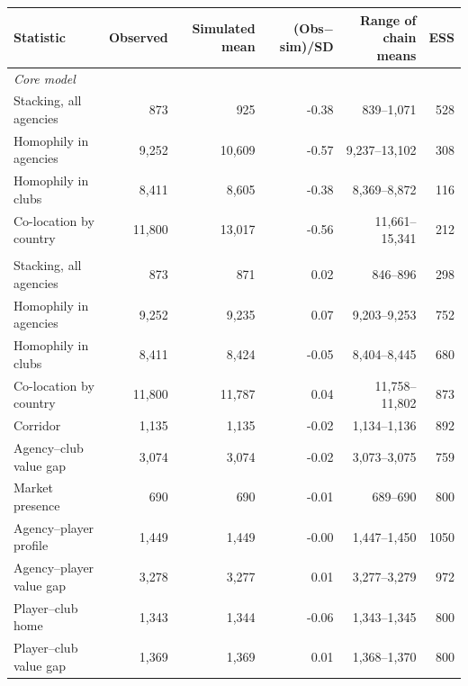 \begin{tabular}{l rrrr r}\toprule
Statistic & Observed & Simulated mean & (Obs$-$sim)/SD & Range of chain means & ESS\\\midrule
\multicolumn{6}{l}{\emph{Core model}}\\
Stacking, all agencies & 873 & 925 & -0.38 & 839--1,071 & 528\\
Homophily in agencies & 9,252 & 10,609 & -0.57 & 9,237--13,102 & 308\\
Homophily in clubs & 8,411 & 8,605 & -0.38 & 8,369--8,872 & 116\\
Co-location by country & 11,800 & 13,017 & -0.56 & 11,661--15,341 & 212\\
\addlinespace
\multicolumn{6}{l}{\emph{Model 1}}\\
Stacking, all agencies & 873 & 871 & 0.02 & 846--896 & 298\\
Homophily in agencies & 9,252 & 9,235 & 0.07 & 9,203--9,253 & 752\\
Homophily in clubs & 8,411 & 8,424 & -0.05 & 8,404--8,445 & 680\\
Co-location by country & 11,800 & 11,787 & 0.04 & 11,758--11,802 & 873\\
Corridor & 1,135 & 1,135 & -0.02 & 1,134--1,136 & 892\\
Agency--club value gap & 3,074 & 3,074 & -0.02 & 3,073--3,075 & 759\\
Market presence & 690 & 690 & -0.01 & 689--690 & 800\\
Agency--player profile & 1,449 & 1,449 & -0.00 & 1,447--1,450 & 1050\\
Agency--player value gap & 3,278 & 3,277 & 0.01 & 3,277--3,279 & 972\\
Player--club home & 1,343 & 1,344 & -0.06 & 1,343--1,345 & 800\\
Player--club value gap & 1,369 & 1,369 & 0.01 & 1,368--1,370 & 800\\
\bottomrule
\end{tabular}
